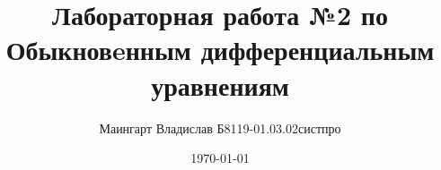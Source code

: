 \author{Маингарт Владислав Б8119-01.03.02систпро}
\title{Лабораторная работа №2 по Обыкновeнным дифференциальным уравнениям}
\date{\today}

\thispagestyle{empty}
\maketitle
